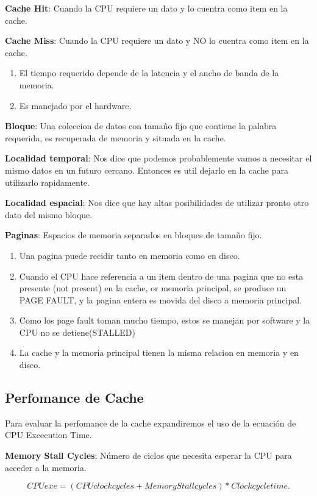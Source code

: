 \documentclass{article}
\begin{document}
\textbf{Cache Hit}: Cuando la CPU requiere un dato y lo cuentra como item en la cache.

\textbf{Cache Miss}: Cuando la CPU requiere un dato y NO lo cuentra como item en la cache.
\begin{enumerate}
\item El tiempo requerido depende de la latencia y el ancho de banda de la memoria.
\item Es manejado por el hardware.
\end{enumerate}

\textbf{Bloque}: Una coleccion de datos con tamaño fijo que contiene la palabra requerida, es recuperada
de memoria y situada en la cache.

\textbf{Localidad temporal}: Nos dice que podemos probablemente vamos a necesitar el mismo datos en un futuro cercano.
    Entonces es util dejarlo en la cache para utilizarlo rapidamente.

\textbf{Localidad espacial}: Nos dice que hay altas posibilidades de utilizar pronto otro dato del mismo bloque.

\textbf{Paginas}: Espacios de memoria separados en bloques de tamaño fijo. 
\begin{enumerate} 
    \item Una pagina puede recidir tanto en memoria como en disco.
    \item Cuando el CPU hace referencia a un item dentro de una pagina que no esta presente (not present) en la cache, or memoria principal, se produce un PAGE FAULT, y la pagina entera es movida del disco a memoria principal.
    \item Como los page fault toman mucho tiempo, estos se manejan por software y la CPU no se detiene(STALLED)
    \item La cache y la memoria principal tienen la misma relacion en memoria y en disco.
\end{enumerate}


\subsection{Perfomance de Cache}

Para evaluar la perfomance de la cache expandiremos el uso de la ecuación de CPU Excecution Time.

\textbf{Memory Stall Cycles}: Número de ciclos que necesita esperar la CPU para acceder a la memoria.

    \begin{equation}
    CPU exe = (CPU clock cycles + Memory Stall cycles ) * Clock cycle time.
    \end{equation}
    
\end{document}
